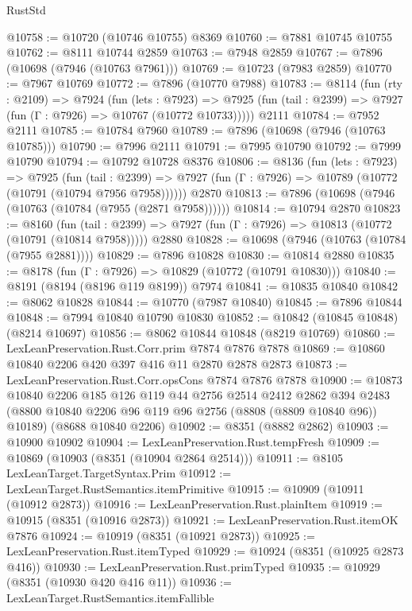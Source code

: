 \begin{lexlean}{RustStd}
\begin{coremodule}
{\begin{coremodule}
{{{{{{{{{{{{{{{{{{{{{{{{{{{{{{{{{{{{{{{{{{{{{{{{{{@10758 := @10720 (@10746 @10755) @8369
@10760 := @7881 @10745 @10755
@10762 := @8111 @10744 @2859
@10763 := @7948 @2859
@10767 := @7896 (@10698 (@7946 (@10763 @7961)))
@10769 := @10723 (@7983 @2859)
@10770 := @7967 @10769
@10772 := @7896 (@10770 @7988)
@10783 := @8114
    (fun (rty : @2109) =>
    @7924
      (fun (lets : @7923) =>
      @7925 (fun (tail : @2399) => @7927 (fun (Γ : @7926) => @10767 (@10772 @10733)))))
    @2111
@10784 := @7952 @2111
@10785 := @10784 @7960
@10789 := @7896 (@10698 (@7946 (@10763 @10785)))
@10790 := @7996 @2111
@10791 := @7995 @10790
@10792 := @7999 @10790
@10794 := @10792 @10728 @8376
@10806 := @8136
    (fun (lets : @7923) =>
    @7925
      (fun (tail : @2399) =>
      @7927 (fun (Γ : @7926) => @10789 (@10772 (@10791 (@10794 @7956 @7958))))))
    @2870
@10813 := @7896 (@10698 (@7946 (@10763 (@10784 (@7955 (@2871 @7958))))))
@10814 := @10794 @2870
@10823 := @8160
    (fun (tail : @2399) => @7927 (fun (Γ : @7926) => @10813 (@10772 (@10791 (@10814 @7958)))))
    @2880
@10828 := @10698 (@7946 (@10763 (@10784 (@7955 @2881))))
@10829 := @7896 @10828
@10830 := @10814 @2880
@10835 := @8178 (fun (Γ : @7926) => @10829 (@10772 (@10791 @10830)))
@10840 := @8191 (@8194 (@8196 @119 @8199)) @7974
@10841 := @10835 @10840
@10842 := @8062 @10828
@10844 := @10770 (@7987 @10840)
@10845 := @7896 @10844
@10848 := @7994 @10840 @10790 @10830
@10852 := @10842 (@10845 @10848) (@8214 @10697)
@10856 := @8062 @10844 @10848 (@8219 @10769)
@10860 := LexLeanPreservation.Rust.Corr.prim @7874 @7876 @7878
@10869 := @10860 @10840 @2206 @420 @397 @416 @11 @2870 @2878 @2873
@10873 := LexLeanPreservation.Rust.Corr.opsCons @7874 @7876 @7878
@10900 := @10873
    @10840
    @2206
    @185
    @126
    @119
    @44
    @2756
    @2514
    @2412
    @2862
    @394
    @2483
    (@8800 @10840 @2206 @96 @119 @96 @2756 (@8808 (@8809 @10840 @96)) @10189)
    (@8688 @10840 @2206)
@10902 := @8351 (@8882 @2862)
@10903 := @10900 @10902
@10904 := LexLeanPreservation.Rust.tempFresh
@10909 := @10869 (@10903 (@8351 (@10904 @2864 @2514)))
@10911 := @8105 LexLeanTarget.TargetSyntax.Prim
@10912 := LexLeanTarget.RustSemantics.itemPrimitive
@10915 := @10909 (@10911 (@10912 @2873))
@10916 := LexLeanPreservation.Rust.plainItem
@10919 := @10915 (@8351 (@10916 @2873))
@10921 := LexLeanPreservation.Rust.itemOK @7876
@10924 := @10919 (@8351 (@10921 @2873))
@10925 := LexLeanPreservation.Rust.itemTyped
@10929 := @10924 (@8351 (@10925 @2873 @416))
@10930 := LexLeanPreservation.Rust.primTyped
@10935 := @10929 (@8351 (@10930 @420 @416 @11))
@10936 := LexLeanTarget.RustSemantics.itemFallible
}}}}}}}}}}}}}}}}}}}}}}}}}}}}}}}}}}}}}}}}}}}}}}}}}}
\end{coremodule}}
\end{coremodule}
\end{lexlean}
